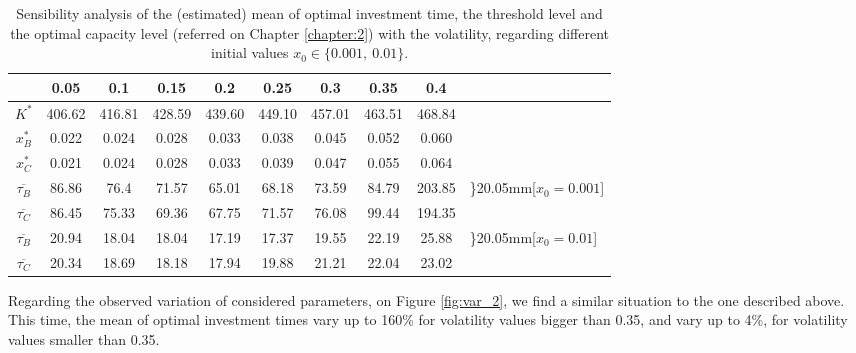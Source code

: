 \begin{table}[!ht]
	\centering
	\caption{Sensibility analysis of the (estimated) mean of optimal investment time, the threshold level and the optimal capacity level (referred on Chapter \ref{chapter:2}) with the volatility, regarding different initial values $x_0 \in \{0.001, \ 0.01\}$.}
	\begin{tabular}{c|ccccccccl}
		\hline
		\text{ $\sigma $ } & 0.05 & 0.1 & 0.15 & 0.2 & 0.25 & 0.3 & 0.35 & 0.4 \\ \hline
		$K^*$ & 406.62 & 416.81 & 428.59 & 439.60 & 449.10 & 457.01 & 463.51 & 468.84  \\
		$x_B^*$ & 0.022 & 0.024 & 0.028 & 0.033 & 0.038 & 0.045 & 0.052 & 0.060  \\
		$x_C^*$ & 0.021 & 0.024 & 0.028 & 0.033 & 0.039 & 0.047 & 0.055 & 0.064 \\ \hline
		$\overline{\tau _B}$ & 86.86 & 76.4 & 71.57 & 65.01 & 68.18 & 73.59 & 84.79 & 203.85  & \rdelim\}{2}{0.05mm}[$x_0=0.001$]  \\
		$\overline{\tau _C}$ & 86.45 & 75.33 & 69.36 & 67.75 & 71.57 & 76.08 & 99.44 & 194.35 \\ \hline
		$\overline{\tau _B}$ & 20.94 & 18.04 & 18.04 & 17.19 & 17.37 & 19.55 & 22.19 & 25.88  &	\rdelim\}{2}{0.05mm}[$x_0=0.01$] \\
		$\overline{\tau _C}$ & 20.34 & 18.69 & 18.18 & 17.94 & 19.88 & 21.21 & 22.04 & 23.02  \\ \hline
	\end{tabular}
\label{tab:vol_2}
\end{table}


Regarding the observed variation of considered parameters, on Figure \ref{fig:var_2}, we find a similar situation to the one described above.
This time, the mean of optimal investment times vary up to 160\%  for volatility values bigger than 0.35, and vary up to 4\%, for volatility values smaller than 0.35.


